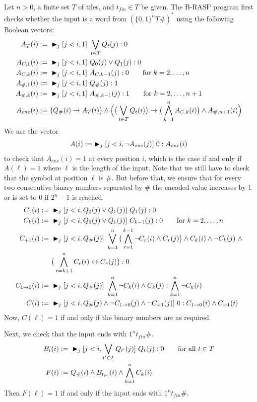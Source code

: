 Let $n >0$, a finite set $T$ of tiles, and $t_\mathit{fin} \in T$ be given.
The B-RASP program first checks whether the input is a word from
$(\{0,1\}^n T \#)^*$ using the following Boolean vectors:
\begin{align*}
A_T(i) :=&\ \blacktriangleright_j[j<i,1]\ \bigvee_{t \in T} Q_t(j) : 0\\
A_{C,1}(i) :=&\ \blacktriangleright_j[j<i,1]\ Q_0(j) \vee Q_1(j) : 0\\
A_{C,k}(i) :=&\ \blacktriangleright_j[j<i,1]\ A_{C,k-1}(j) : 0 \qquad \text{for } k = 2,\dots,n\\
A_{\#,1}(i) :=&\ \blacktriangleright_j[j<i,1]\ Q_\#(j) : 1\\
A_{\#,k}(i) :=&\ \blacktriangleright_j[j<i,1]\ A_{\#,k-1}(j) : 1 \qquad \text{for } k = 2,\dots,n+1\\
A_{\mathit{enc}}(i) :=&\ \big(Q_\#(i) \to A_T(i)\big) \wedge
\Big(\big(\bigvee_{t \in T} Q_t(i)\big) \to \big(\bigwedge_{k=1}^n A_{C,k}(i)\big) \wedge A_{\#,n+1}(i)\Big)
\end{align*}
We use the vector
\[A(i) :=\ \blacktriangleright_j [j<i,\neg A_\mathit{enc}(j)]\ 0 : A_\mathit{enc}(i)\]
to check that $A_\mathit{enc}(i) = 1$ at every position $i$,
which is the case if and only if $A(\ell) = 1$
where $\ell$ is the length of the input.
Note that we still have to check that the symbol at position $\ell$ is $\#$.
But before that, we ensure that for every two consecutive binary numbers separated by $\#$ the encoded value increases by 1
or is set to 0 if $2^n-1$ is reached.
\begin{align*}
C_1(i) :=&\ \blacktriangleright_j[j<i,Q_0(j) \vee Q_1(j)]\ Q_1(j) : 0\\
C_k(i) :=&\ \blacktriangleright_j[j<i,Q_0(j) \vee Q_1(j)]\ C_{k-1}(j) : 0 \qquad \text{for } k=2,\dots,n\\
C_{+1}(i) :=&\ \blacktriangleright_j[j<i,Q_\#(j)]\ \bigvee_{k=1}^n \big(\bigwedge_{r=1}^{k-1} \neg C_r(i) \wedge C_r(j)\big) \wedge
C_k(i) \wedge \neg C_k(j)\ \wedge\\ &\ \big(\bigwedge_{r=k+1}^{n} C_r(i) \leftrightarrow C_r(j)\big) : 0\\
C_{1 \to 0}(i) :=&\ \blacktriangleright_j[j<i,Q_\#(j)]\ \bigwedge_{k=1}^n \neg C_k(i) \wedge C_k(j) : \bigwedge_{k=1}^n \neg C_k(i)\\
C(i) :=&\ \blacktriangleright_j[j<i,Q_\#(j) \wedge \neg C_{1 \to 0}(j) \wedge \neg C_{+1}(j)]\ 0 : C_{1 \to 0}(i) \wedge C_{+1}(i)
\end{align*} 
Now, $C(\ell) = 1$ if and only if the binary numbers are as required.

Next, we check that the input ends with $1^n t_\mathit{fin} \#$.
\begin{align*}
B_{t}(i) :=&\ \maxatt_j[j<i,\bigvee_{t' \in T} Q_{t'}(j)]\ Q_{t}(j) : 0 \qquad \text{for all } t \in T\\
F(i) :=&\ Q_\#(i) \wedge B_{t_\mathit{fin}}(i) \wedge \bigwedge_{k=1}^n C_k(i)
\end{align*}
Then $F(\ell) = 1$ if and only if the input ends with $1^n t_\mathit{fin} \#$.

